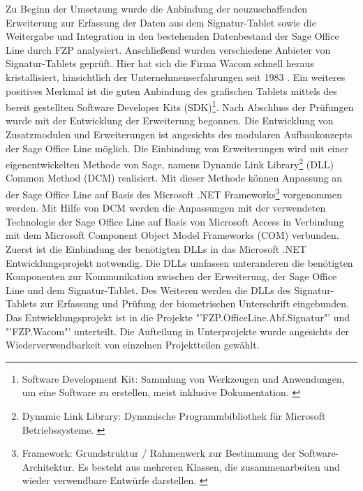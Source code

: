 Zu Beginn der Umsetzung wurde die Anbindung der neuzuschaffenden Erweiterung zur Erfassung der Daten aus dem Signatur-Tablet sowie die Weitergabe und Integration in den bestehenden Datenbestand der Sage Office Line durch FZP analysiert. Anschließend wurden verschiedene Anbieter von Signatur-Tablets geprüft. Hier hat sich die Firma Wacom schnell heraus kristallisiert, hinsichtlich der Unternehmenserfahrungen seit 1983 \cite{konzept1}. Ein weiteres positives Merkmal ist die guten Anbindung des grafischen Tablets mittels des bereit gestellten Software Developer Kits (SDK)\footnote{\label{foot:4}Software Development Kit: Sammlung von Werkzeugen und Anwendungen, um eine Software zu erstellen, meist inklusive Dokumentation. \cite{SDK}}. Nach Abschluss der Prüfungen wurde mit der Entwicklung der Erweiterung begonnen. Die Entwicklung von Zusatzmodulen und Erweiterungen ist angesichts des modularen Aufbaukonzepts der Sage Office Line möglich. Die Einbindung von Erweiterungen wird mit einer eigenentwickelten Methode von Sage, namens Dynamic Link Library\footnote{\label{foot:6}Dynamic Link Library: Dynamische Programmbibliothek für Microsoft Betriebssysteme. \cite{DLL}} (DLL) Common Method (DCM) realisiert. Mit dieser Methode können Anpassung an der Sage Office Line auf Basis des Microsoft .NET Frameworks\footnote{\label{foot:5}Framework: Grundstruktur / Rahmenwerk zur Bestimmung der 
Software-Architektur. Es besteht aus mehreren Klassen, die zusammenarbeiten und wieder verwendbare Entwürfe darstellen. \cite{framework}} vorgenommen werden. Mit Hilfe von DCM werden die Anpassungen mit der verwendeten Technologie der Sage Office Line auf Basis von Microsoft Access in Verbindung mit dem Microsoft Component Object Model Frameworks (COM) verbunden. Zuerst ist die Einbindung der benötigten DLLs in das Microsoft .NET Entwicklungsprojekt notwendig. Die DLLs umfassen unteranderen die benötigten Komponenten zur Kommunikation zwischen der Erweiterung, der Sage Office Line und dem Signatur-Tablet. Des Weiteren werden die DLLs des Signatur-Tablets zur Erfassung und Prüfung der biometrischen Unterschrift eingebunden. Das Entwicklungsprojekt ist in die Projekte "'FZP.OfficeLine.Abf.Signatur"' und "'FZP.Wacom"' unterteilt. Die Aufteilung in Unterprojekte wurde angesichts der Wiederverwendbarkeit von einzelnen Projektteilen gewählt.
